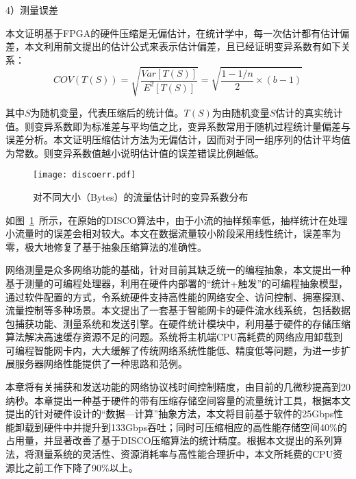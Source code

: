 4）测量误差

本文证明基于FPGA的硬件压缩是无偏估计，在统计学中，每一次估计都有估计偏差，本文利用前文提出的估计公式来表示估计偏差，且已经证明变异系数有如下关系：
\begin{equation} \label{mydiscofl}
COV(T(S))=\sqrt{\dfrac{Var[T(S)]}{E^2[T(S)]}}=\sqrt{\dfrac{1-1/n}{2}\times (b-1)}
\end{equation}

其中$ S $为随机变量，代表压缩后的统计值。$ T(S) $为由随机变量$ S $估计的真实统计值。则变异系数即为标准差与平均值之比，变异系数常用于随机过程统计量偏差与误差分析。本文证明压缩估计方法为无偏估计，因而对于同一组序列的估计平均值为常数。则变异系数值越小说明估计值的误差错误比例越低。

\begin{figure}[!ht]
	\centering 
	\vspace{-1.5mm} 
	\texttt{[image: discoerr.pdf]}
	\caption{对不同大小（Bytes）的流量估计时的变异系数分布} \label{fig:discoerr}
\end{figure}


如图~\ref{fig:discoerr}~所示，在原始的DISCO算法中，由于小流的抽样频率低，抽样统计在处理小流量时的误差会相对较大。本文在数据流量较小阶段采用线性统计，误差率为零，极大地修复了基于抽象压缩算法的准确性。


\label{chap38}


网络测量是众多网络功能的基础，针对目前其缺乏统一的编程抽象，本文提出一种基于测量的可编程处理器，利用在硬件内部署的“统计+触发”的可编程抽象模型，通过软件配置的方式，令系统硬件支持高性能的网络安全、访问控制、拥塞探测、流量控制等多种场景。本文提出了一套基于智能网卡的硬件流水线系统，包括数据包捕获功能、测量系统和发送引擎。在硬件统计模块中，利用基于硬件的存储压缩算法解决高速缓存资源不足的问题。系统将主机端CPU高耗费的网络应用卸载到可编程智能网卡内，大大缓解了传统网络系统性能低、精度低等问题，为进一步扩展服务器网络性能提供了一种思路和范例。

本章将有关捕获和发送功能的网络协议栈时间控制精度，由目前的几微秒提高到20纳秒。本章提出一种基于硬件的带有压缩存储空间容量的流量统计工具，根据本文提出的针对硬件设计的“数据---计算”抽象方法，本文将目前基于软件的25Gbps性能卸载到硬件中并提升到133Gbps吞吐；同时可压缩相应的高性能存储空间40\%的占用量，并显著改善了基于DISCO压缩算法的统计精度。根据本文提出的系列算法，将测量系统的灵活性、资源消耗率与高性能合理折中，本文所耗费的CPU资源比之前工作下降了90\%以上。















